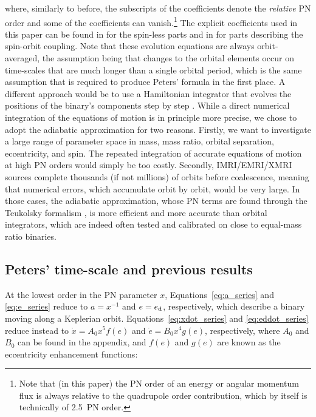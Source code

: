 \documentclass[usenatbib]{mnras}
\begin{document}
\noindent where, similarly to before, the subscripts of the coefficients denote the \textit{relative} PN order and some of the coefficients can vanish.\footnote{Note that (in this paper) the PN order of an energy or angular momentum flux is always relative to the quadrupole order contribution, which by itself is technically of 2.5~PN order.} The explicit coefficients used in this paper can be found in \cite{yannick} for the spin-less parts and in \cite{jetzer} for parts describing the spin-orbit coupling. Note that these evolution equations are always orbit-averaged, the assumption being that changes to the orbital elements occur on time-scales that are much longer than a single orbital period, which is the same assumption that is required to produce Peters' formula in the first place. A different approach would be to use a Hamiltonian integrator that evolves the positions of the binary's components step by step \citep[see, e.g.][]{2008AN....329..904B,2010PhRvD..81j4025L,2019PhRvD.100b4015I}. While a direct numerical integration of the equations of motion is in principle more precise, we chose to adopt the adiabatic approximation for two reasons. Firstly, we want to investigate a large range of parameter space in mass, mass ratio, orbital separation, eccentricity, and spin. The repeated integration of accurate equations of motion at high PN orders would simply be too costly. Secondly, IMRI/EMRI/XMRI sources complete thousands (if not millions) of orbits before coalescence, meaning that numerical errors, which accumulate orbit by orbit, would be very large. In those cases, the adiabatic approximation, whose PN terms are found through the Teukolsky formalism \citep{1973ApJ...185..635T,2007CQGra..24R.113A}, is more efficient and more accurate than orbital integrators, which are indeed often tested and calibrated on close to equal-mass ratio binaries. 

\subsection{Peters' time-scale and previous results}

At the lowest order in the PN parameter $x$, Equations~\eqref{eq:a_series} and \eqref{eq:e_series} reduce to $a= x^{-1}$ and $e = e_{ \rm d}$, respectively, which describe a binary moving along a Keplerian orbit. Equations~\eqref{eq:xdot_series} and \eqref{eq:eddot_series} reduce instead to $\dot{x}= A_0 x^5 f(e)$ and $\dot{e}= B_0 x^4 g(e)$, respectively, where $A_0$ and $B_0$ can be found in the appendix, and $f(e)$ and $g(e)$ are known as the eccentricity enhancement functions:
\end{document}

